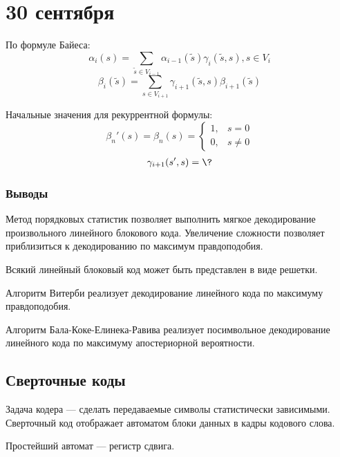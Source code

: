 \chapter{30 сентября}

По формуле Байеса:
\[\alpha_i(s) = \sum_{\tilde{s} \in V_{i-1}} \alpha_{i-1}(\tilde{s}) \gamma_i(\tilde{s}, s), s \in V_i\]
\[\beta_i(\tilde{s}) = \sum_{s \in V_{i+1}} \gamma_{i+1}(\tilde{s}, s) \beta_{i+1}(\tilde{s})\]
\unfinished

Начальные значения для рекуррентной формулы:
\[\beta_n'(s) = \beta_n(s) = \begin{cases}
    1, & s = 0 \\
    0, & s \neq 0
\end{cases}\]
\begin{align}
    \gamma_{i+1}(s', s) & = \? \\
\end{align}

\unfinished

\subsection{Выводы}

Метод порядковых статистик позволяет выполнить мягкое декодирование произвольного линейного блокового кода. Увеличение сложности позволяет приблизиться к декодированию по максимум правдоподобия.

Всякий линейный блоковый код может быть представлен в виде решетки.

Алгоритм Витерби реализует декодирование линейного кода по максимуму правдоподобия.

Алгоритм Бала-Коке-Елинека-Равива реализует посимвольное декодирование линейного кода по максимуму апостериорной вероятности.

\section{Сверточные коды}

Задача кодера --- сделать передаваемые символы статистически зависимыми.
Сверточный код отображает автоматом блоки данных в кадры кодового слова.

\begin{example}
    Простейший автомат --- регистр сдвига.
\end{example}

\unfinished